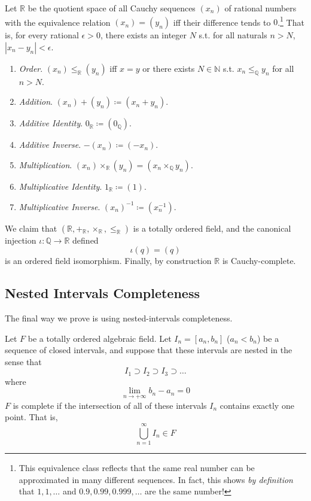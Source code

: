   \begin{theorem}
    Let $\mathbb{R}$ be the quotient space of all Cauchy sequences $(x_n)$ of rational numbers with the equivalence relation $(x_n) = (y_n)$ iff their difference tends to $0$.\footnote{This equivalence class reflects that the same real number can be approximated in many different sequences. In fact, this shows \textit{by definition} that $1, 1, \ldots$ and $0.9, 0.99, 0.999, \ldots$ are the same number!} That is, for every rational $\epsilon > 0$, there exists an integer $N$ s.t. for all naturals $n > N$, $|x_n - y_n| < \epsilon$. 
    \begin{enumerate}
      \item \textit{Order}. $(x_n) \leq_{\mathbb{R}} (y_n)$ iff $x = y$ or there exists $N \in \mathbb{N}$ s.t. $x_n \leq_{\mathbb{Q}} y_n$ for all $n > N$. 
      \item \textit{Addition}. $(x_n) + (y_n) \coloneqq (x_n + y_n)$. 
      \item \textit{Additive Identity}. $0_{\mathbb{R}} \coloneqq (0_{\mathbb{Q}})$. 
      \item \textit{Additive Inverse}. $-(x_n) \coloneqq (-x_n)$. 
      \item \textit{Multiplication}. $(x_n) \times_{\mathbb{R}} (y_n) = (x_n \times_{\mathbb{Q}} y_n)$. 
      \item \textit{Multiplicative Identity}. $1_{\mathbb{R}} \coloneqq (1)$. 
      \item \textit{Multiplicative Inverse}. $(x_n)^{-1} \coloneqq (x_n^{-1})$. 
    \end{enumerate}
    We claim that $(\mathbb{R}, +_{\mathbb{R}}, \times_{\mathbb{R}}, \leq_{\mathbb{R}})$ is a totally ordered field, and the canonical injection $\iota: \mathbb{Q} \rightarrow \mathbb{R}$ defined 
    \begin{equation}
      \iota(q) = (q)
    \end{equation} 
    is an ordered field isomorphism. Finally, by construction $\mathbb{R}$ is Cauchy-complete. 
  \end{theorem}

\subsection{Nested Intervals Completeness} 

  The final way we prove is using nested-intervals completeness.  

  \begin{definition}
    Let $F$ be a totally ordered algebraic field. Let $I_n= [a_n, b_n]$ ($a_n < b_n$) be a sequence of closed intervals, and suppose that these intervals are nested in the sense that
    \[I_1 \supset I_2 \supset I_3 \supset \ldots\]
    where 
    \[\lim_{n \rightarrow + \infty} b_n - a_n = 0\]
    $F$ is complete if the intersection of all of these intervals $I_n$ contains exactly one point. That is, 
    \[\bigcup_{n=1}^\infty I_n \in F\]
  \end{definition}

